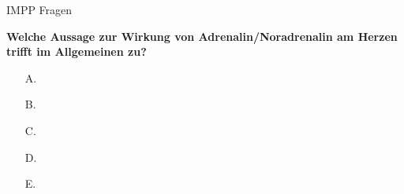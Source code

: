 \documentclass{beamer}
\begin{document}




\begin{frame}{IMPP Fragen}


\textbf{ Welche Aussage zur Wirkung von Adrenalin/Noradrenalin am Herzen trifft im Allgemeinen zu?} \\[0.2 cm]

\begin{itemize}
\item[A.] 
\item[B.] 
\item[C.] 
\item[D.] 
\item[E.] 

\end{itemize}

    
\end{frame}





\section{}

\end{document}
